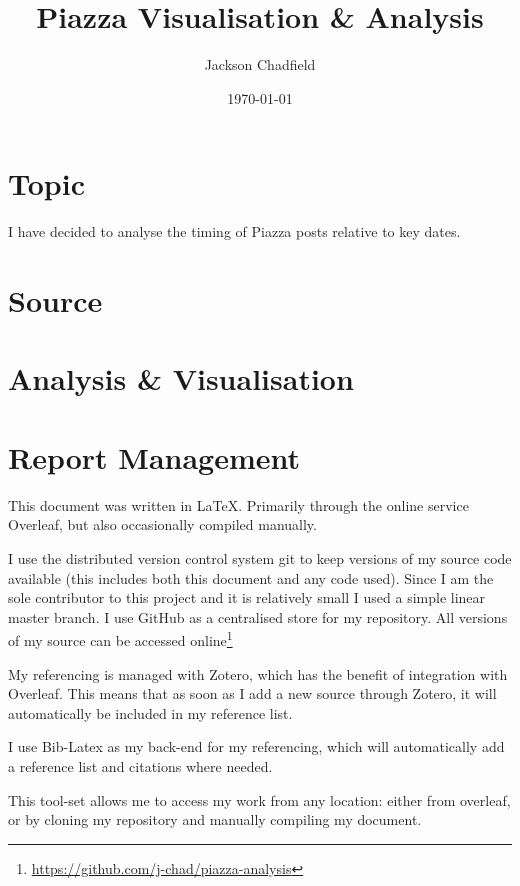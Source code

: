 \documentclass{scrartcl}
\title{Piazza Visualisation \& Analysis}
\author{Jackson Chadfield}
\date{\today}
\begin{document}
\maketitle

\section{Topic}
I have decided to analyse the timing of Piazza posts relative to key dates.

\section{Source}

\section{Analysis \& Visualisation}

\section{Report Management}
This document was written in \LaTeX. Primarily through the online service Overleaf, but also occasionally compiled manually.

I use the distributed version control system git to keep versions of my source code available (this includes both this document and any code used). Since I am the sole contributor to this project and it is relatively small I used a simple linear master branch. I use GitHub as a centralised store for my repository. All versions of my source can be accessed online\footnote{\url{https://github.com/j-chad/piazza-analysis}}

My referencing is managed with Zotero, which has the benefit of integration with Overleaf. This means that as soon as I add a new source through Zotero, it will automatically be included in my reference list. 

I use Bib-Latex as my back-end for my referencing, which will automatically add a reference list and citations where needed.

This tool-set allows me to access my work from any location: either from overleaf, or by cloning my repository and manually compiling my document.
\end{document}
